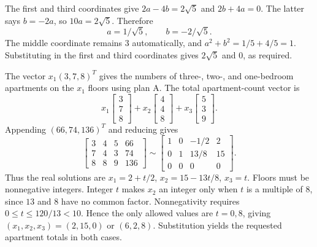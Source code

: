 The first and third coordinates give
$2a-4b=2\sqrt5$ and $2b+4a=0$. The latter says $b=-2a$,
so $10a=2\sqrt5$. Therefore
\[
 a=1/\sqrt5,\qquad b=-2/\sqrt5.
\]
The middle coordinate remains $3$ automatically, and
$a^2+b^2=1/5+4/5=1$. Substituting in the first and third
coordinates gives $2\sqrt5$ and $0$, as required.

The vector $x_1(3,7,8)^T$ gives the numbers of three-, two-, and
one-bedroom apartments on the $x_1$ floors using plan A.
The total apartment-count vector is
\[
 x_1\begin{bmatrix}3\\7\\8\end{bmatrix}
 +x_2\begin{bmatrix}4\\4\\8\end{bmatrix}
 +x_3\begin{bmatrix}5\\3\\9\end{bmatrix}.
\]
Appending $(66,74,136)^T$ and reducing gives
\[
 \left[\begin{array}{ccc|c}3&4&5&66\\7&4&3&74\\8&8&9&136\end{array}\right]
 \sim
 \left[\begin{array}{ccc|c}1&0&-1/2&2\\0&1&13/8&15\\0&0&0&0\end{array}\right].
\]
Thus the real solutions are $x_1=2+t/2$, $x_2=15-13t/8$,
$x_3=t$. Floors must be nonnegative integers. Integer $t$ makes
$x_2$ an integer only when $t$ is a multiple of $8$, since $13$
and $8$ have no common factor. Nonnegativity requires
$0\le t\le120/13<10$. Hence the only allowed values are $t=0,8$,
giving $(x_1,x_2,x_3)=(2,15,0)$ or $(6,2,8)$.
Substitution yields the requested apartment totals in both cases.
